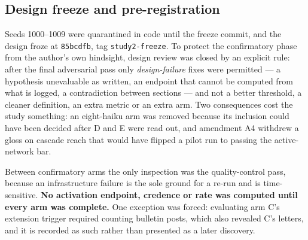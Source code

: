 \documentclass[pdflatex,sn-basic]{sn-jnl}
\begin{document}
\hypertarget{design-freeze-and-pre-registration}{%
\subsection{Design freeze and pre-registration}\label{design-freeze-and-pre-registration}}

Seeds 1000--1009 were quarantined in
code until the freeze commit, and the design froze at \texttt{85bcdfb}, tag \texttt{study2-freeze}. To protect the
confirmatory phase from the author's own hindsight, design review was closed by an explicit
rule: after the final adversarial pass only \emph{design-failure}
fixes were permitted --- a hypothesis unevaluable as written, an endpoint that cannot be computed
from what is logged, a contradiction between sections --- and not a better threshold, a cleaner
definition, an extra metric or an extra arm. Two consequences cost the study something: an eight-haiku arm was removed because its
inclusion could have been decided after D and E were read out, and amendment A4 withdrew a
gloss on cascade reach that would have flipped a pilot run to passing the active-network
bar.

Between confirmatory arms the only inspection was the quality-control pass, because an
infrastructure failure is the sole ground for a re-run and is time-sensitive. \textbf{No
activation endpoint, credence or rate was computed until every arm was complete.} One
exception was forced: evaluating arm C's extension trigger required counting bulletin
posts, which also revealed C's letters, and it is recorded as such rather than presented
as a later discovery.
\end{document}
